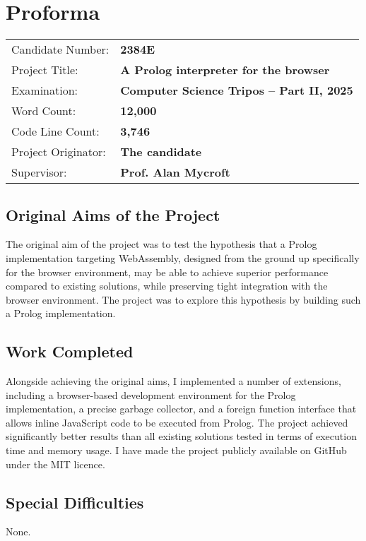 \chapter*{Proforma}

{\large \begin{tabular}{ll}
Candidate Number: & {\bf 2384E} \\
Project Title: & {\bf A Prolog interpreter for the browser} \\
Examination: & {\bf Computer Science Tripos -- Part II, 2025} \\
Word Count: & {\bf 12,000}\footnotemark \\
Code Line Count: & {\bf 3,746}\footnotemark \\
Project Originator: & {\bf The candidate} \\
Supervisor: & {\bf Prof. Alan Mycroft}
\end{tabular}}


\section*{Original Aims of the Project}

The original aim of the project was to test the hypothesis that a Prolog implementation targeting WebAssembly, designed from the ground up specifically for the browser environment, may be able to achieve superior performance compared to existing solutions, while preserving tight integration with the browser environment. The project was to explore this hypothesis by building such a Prolog implementation.

\section*{Work Completed}

Alongside achieving the original aims, I implemented a number of extensions, including a browser-based development environment for the Prolog implementation, a precise garbage collector, and a foreign function interface that allows inline JavaScript code to be executed from Prolog. The project achieved significantly better results than all existing solutions tested in terms of execution time and memory usage. I have made the project publicly available on GitHub under the MIT licence.

\section*{Special Difficulties}

None.